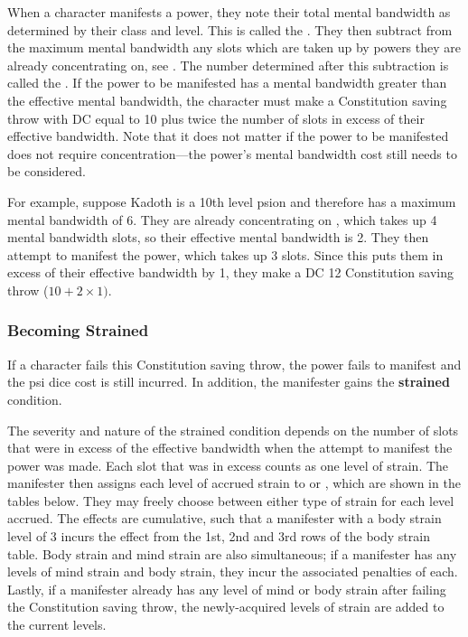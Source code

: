 When a character manifests a power,
they note their total mental bandwidth
as determined by their class and level.
This is called the
.
They then subtract from the maximum mental bandwidth
any slots which are taken up by powers they are already concentrating on,
see .
The number determined after this subtraction is called the
.
If the power to be manifested has a mental bandwidth
greater than the effective mental bandwidth,
the character must make a Constitution saving throw with
DC equal to 10 plus twice the number of slots
in excess of their effective bandwidth.
Note that it does not matter if the power to be manifested
does not require concentration---the power's mental bandwidth cost
still needs to be considered.

For example,
suppose Kadoth is a 10th level psion
and therefore has a maximum mental bandwidth of 6.
They are already concentrating on ,
which takes up 4 mental bandwidth slots,
so their effective mental bandwidth is 2.
They then attempt to manifest the  power,
which takes up 3 slots.
Since this puts them in excess of their effective bandwidth by 1,
they make a DC 12 Constitution saving throw ($10 + 2 \times 1)$.

\subsubsection{Becoming Strained}
If a character fails this Constitution saving throw,
the power fails to manifest
and the psi dice cost is still incurred.
In addition, the manifester gains the \textbf{strained} condition.

The severity and nature of the strained condition
depends on the number of slots
that were in excess of the effective bandwidth when the attempt
to manifest the power was made.
Each slot that was in excess counts as one level of strain.
The manifester then assigns each level of accrued strain
to  or ,
which are shown in the tables below.
They may freely choose between either type of strain
for each level accrued.
The effects are cumulative,
such that a manifester with a body strain level of 3
incurs the effect from the 1st, 2nd and 3rd rows of the
body strain table.
Body strain and mind strain are also simultaneous;
if a manifester has any levels of mind strain and body strain,
they incur the associated penalties of each.
Lastly,
if a manifester already has any level of mind or body strain
after failing the Constitution saving throw,
the newly-acquired levels of strain are added to the current levels.

